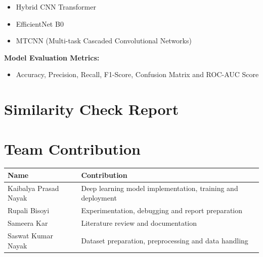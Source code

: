 \documentclass[12pt,a4paper]{report}
\begin{document}
\begin{itemize}
\item Hybrid CNN Transformer
\item EfficientNet B0
\item MTCNN (Multi-task Cascaded Convolutional Networks)
\end{itemize}


\vspace{0.5cm}

\textbf{Model Evaluation Metrics:}

\begin{itemize}
\item Accuracy, Precision, Recall, F1-Score, Confusion Matrix and ROC-AUC Score
\end{itemize}
\clearpage

\section*{Similarity Check Report}


\newpage
\section*{Team Contribution}

\begin{table}[h!]
\centering
\renewcommand{\arraystretch}{1.8}

\begin{tabular}{|p{5cm}|p{9cm}|}
\hline
\textbf{Name} & \textbf{Contribution} \\
\hline

Kaibalya Prasad Nayak &
Deep learning model implementation, training and deployment \\
\hline

Rupali Bisoyi &
Experimentation, debugging and report preparation \\
\hline

Sameera Kar &
Literature review and documentation \\
\hline

Saswat Kumar Nayak &
Dataset preparation, preprocessing and data handling \\
\hline

\end{tabular}

\end{table}


\newpage
\end{document}
